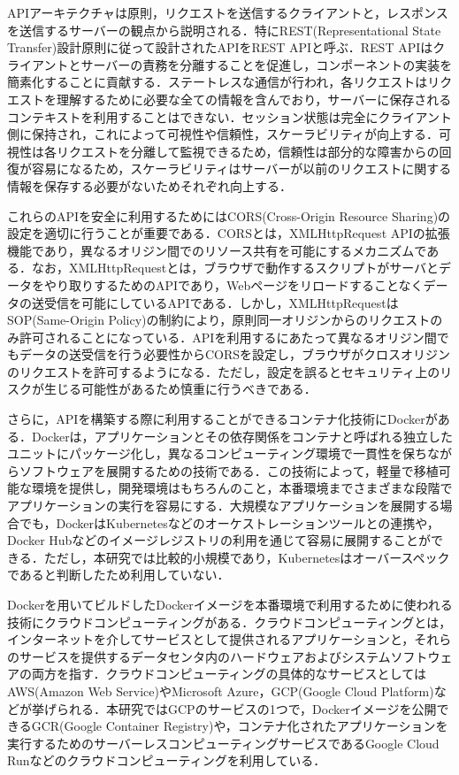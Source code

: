       \par APIアーキテクチャは原則，リクエストを送信するクライアントと，レスポンスを送信するサーバーの観点から説明される．特にREST(Representational State Transfer)設計原則に従って設計されたAPIをREST APIと呼ぶ．REST APIはクライアントとサーバーの責務を分離することを促進し，コンポーネントの実装を簡素化することに貢献する．ステートレスな通信が行われ，各リクエストはリクエストを理解するために必要な全ての情報を含んでおり，サーバーに保存されるコンテキストを利用することはできない．セッション状態は完全にクライアント側に保持され，これによって可視性や信頼性，スケーラビリティが向上する．可視性は各リクエストを分離して監視できるため，信頼性は部分的な障害からの回復が容易になるため，スケーラビリティはサーバーが以前のリクエストに関する情報を保存する必要がないためそれぞれ向上する\cite{fielding2000architectural}．
      \par これらのAPIを安全に利用するためにはCORS(Cross-Origin Resource Sharing)の設定を適切に行うことが重要である．CORSとは，XMLHttpRequest APIの拡張機能であり，異なるオリジン間でのリソース共有を可能にするメカニズムである\cite{10431636}．なお，XMLHttpRequestとは，ブラウザで動作するスクリプトがサーバとデータをやり取りするためのAPIであり，Webページをリロードすることなくデータの送受信を可能にしているAPIである．しかし，XMLHttpRequestはSOP(Same-Origin Policy)の制約により，原則同一オリジンからのリクエストのみ許可されることになっている．APIを利用するにあたって異なるオリジン間でもデータの送受信を行う必要性からCORSを設定し，ブラウザがクロスオリジンのリクエストを許可するようになる．ただし，設定を誤るとセキュリティ上のリスクが生じる可能性があるため慎重に行うべきである．
      \par さらに，APIを構築する際に利用することができるコンテナ化技術にDockerがある．Dockerは，アプリケーションとその依存関係をコンテナと呼ばれる独立したユニットにパッケージ化し，異なるコンピューティング環境で一貫性を保ちながらソフトウェアを展開するための技術である．この技術によって，軽量で移植可能な環境を提供し，開発環境はもちろんのこと，本番環境までさまざまな段階でアプリケーションの実行を容易にする\cite{muzumdar2024navigating}．大規模なアプリケーションを展開する場合でも，DockerはKubernetesなどのオーケストレーションツールとの連携や，Docker Hubなどのイメージレジストリの利用を通じて容易に展開することができる．ただし，本研究では比較的小規模であり，Kubernetesはオーバースペックであると判断したため利用していない．
      \par Dockerを用いてビルドしたDockerイメージを本番環境で利用するために使われる技術にクラウドコンピューティングがある．クラウドコンピューティングとは，インターネットを介してサービスとして提供されるアプリケーションと，それらのサービスを提供するデータセンタ内のハードウェアおよびシステムソフトウェアの両方を指す\cite{armbrust2010view}．クラウドコンピューティングの具体的なサービスとしてはAWS(Amazon Web Service)やMicrosoft Azure，GCP(Google Cloud Platform)などが挙げられる．本研究ではGCPのサービスの1つで，Dockerイメージを公開できるGCR(Google Container Registry)や，コンテナ化されたアプリケーションを実行するためのサーバーレスコンピューティングサービスであるGoogle Cloud Runなどのクラウドコンピューティングを利用している．
      
